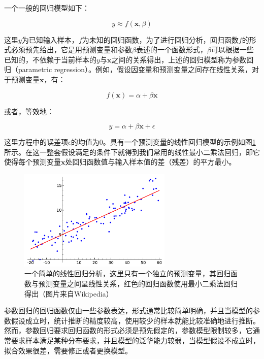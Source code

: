 一个一般的回归模型如下：

\begin{equation}
	y\approx f(\mathbf{x},\beta)
\end{equation}

\noindent 这里$y$为已知输入样本，$f$为未知的回归函数，为了进行回归分析，回归函数$f$的形式必须预先给出，它是用预测变量和参数$\beta$表述的一个函数形式，$\beta$可以根据一些已知的，不依赖于当前样本的$y$与$\mathbf{x}$之间的关系得出，上述的回归模型称为参数回归（parametric regression）。例如，假设因变量和预测变量之间存在线性关系，对于预测变量$\mathbf{x}$，有：

\begin{equation}
	f(\mathbf{x})=\alpha+\beta \mathbf{x}
\end{equation}

\noindent 或者，等效地：

\begin{equation}
	y=\alpha+\beta \mathbf{x}+\epsilon
\end{equation}

\noindent 这里方程中的误差项$\epsilon$的均值为0。具有一个预测变量的线性回归模型的示例如图\ref{f:pt-linear-regression}所示。在这一整套假设满足的条件下就得到我们常用的线性最小二乘法回归，即它使得每个预测变量$\mathbf{x}$处回归函数值与输入样本值的差（残差）的平方最小。

\begin{figure}
	\sidecaption
	\includegraphics[width=0.65\textwidth]{figures/pt/linear-regression}
	\caption{一个简单的线性回归分析，这里只有一个独立的预测变量，其回归函数与预测变量之间呈线性关系，红色的回归函数使用最小二乘法回归得出（图片来自Wikipedia）}
	\label{f:pt-linear-regression}
\end{figure}

参数回归的回归函数仅由一些参数表达，形式通常比较简单明确，并且当模型的参数假设成立时，统计推断的精度较高，使用较少的样本就能比较准确地进行推断。然而，参数回归要求回归函数的形式必须是预先假定的，参数模型限制较多，它通常要求样本满足某种分布要求，并且模型的泛华能力较弱，当模型假设不成立时，拟合效果很差，需要修正或者更换模型。

